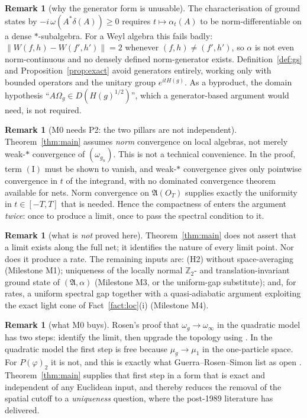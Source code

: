 \documentclass[11pt,a4paper]{article}
\theoremstyle{plain}
\theoremstyle{definition}
\newtheorem{remark}[theorem]{Remark}
\newcommand{\A}{\mathfrak{A}}
\newcommand{\Z}{\mathbb{Z}}
\newcommand{\Om}{\Omega}
\begin{document}
\begin{remark}[why the generator form is unusable]\label{rem:nogenerator}
The characterisation of ground states by $-i\,\omega(A^*\delta(A))\ge0$ requires
$t\mapsto\alpha_t(A)$ to be norm-differentiable on a dense $*$-subalgebra. For a Weyl algebra
this fails badly: $\|W(f,h)-W(f',h')\|=2$ whenever $(f,h)\neq(f',h')$, so $\alpha$ is not even
norm-continuous and no densely defined norm-generator exists. Definition~\ref{def:gs} and
Proposition~\ref{prop:exact} avoid generators entirely, working only with bounded operators and
the unitary group $e^{itH(g)}$. As a byproduct, the domain hypothesis
``$A\Om_g\in D(H(g)^{1/2})$'', which a generator-based argument would need, is not required.
\end{remark}

\begin{remark}[M0 needs P2: the two pillars are not independent]\label{rem:dependency}
Theorem~\ref{thm:main} assumes \emph{norm} convergence on local algebras, not merely weak-$*$
convergence of $(\omega_{g_n})$. This is not a technical convenience. In the proof, term
$(\mathrm I)$ must be shown to vanish, and weak-$*$ convergence gives only pointwise convergence
in $t$ of the integrand, with no dominated convergence theorem available for nets. Norm
convergence on $\A(O_T)$ supplies exactly the uniformity in $t\in[-T,T]$ that is needed. Hence
the compactness of \cite[Thm.~2.3]{GJIII} enters the argument \emph{twice}: once to produce a
limit, once to pass the spectral condition to it.
\end{remark}

\begin{remark}[what is \emph{not} proved here]\label{rem:notproved}
Theorem~\ref{thm:main} does not assert that a limit exists along the full net; it identifies the
nature of every limit point. Nor does it produce a rate. The remaining inputs are:
\textup{(H2)} without space-averaging (Milestone M1); uniqueness of the locally normal
$\Z_2$- and translation-invariant ground state of $(\A,\alpha)$ (Milestone M3, or the
uniform-gap substitute); and, for rates, a uniform spectral gap together with a quasi-adiabatic
argument exploiting the exact light cone of Fact~\ref{fact:loc}(i) (Milestone M4).
\end{remark}

\begin{remark}[what M0 buys]
Rosen's proof that $\omega_g\to\omega_\infty$ in the quadratic model \cite[\S5]{Rosen72} has two
steps: identify the limit, then upgrade the topology using \cite[Thm.~4.1]{GJIII}. In the
quadratic model the first step is free because $\mu_g\to\mu_1$ in the one-particle space. For
$P(\varphi)_2$ it is not, and this is exactly what Guerra--Rosen--Simon list as open
\cite[Problems 1--2]{GRS75}. Theorem~\ref{thm:main} supplies that first step in a form that is
exact and independent of any Euclidean input, and thereby reduces the removal of the spatial
cutoff to a \emph{uniqueness} question, where the post-1989 literature has delivered.
\end{remark}
\end{document}
